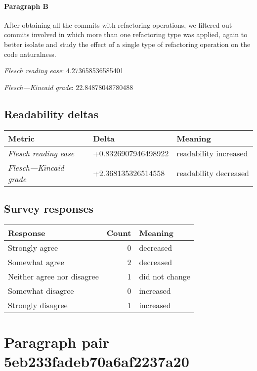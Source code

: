 \paragraph{Paragraph B}
After obtaining all the commits with refactoring operations, we filtered out commits involved in which more than one refactoring type was applied, again to better isolate and study the effect of a single type of refactoring operation on the code naturalness.\par\medskip\emph{Flesch reading ease}: 4.273658536585401\par\emph{Flesch---Kincaid grade}: 22.84878048780488

\subsection{Readability deltas}

\begin{tabular}{lll}
\toprule
               \textbf{Metric} &       \textbf{Delta} &       \textbf{Meaning} \\
\midrule
    \emph{Flesch reading ease} &  +0.8326907946498922 &  readability increased \\
 \emph{Flesch---Kincaid grade} &   +2.368135326514558 &  readability decreased \\
\bottomrule
\end{tabular}

\subsection{Survey responses}
\begin{tabular}{lrl}
\toprule
          \textbf{Response} &  \textbf{Count} & \textbf{Meaning} \\
\midrule
             Strongly agree &               0 &        decreased \\
             Somewhat agree &               2 &        decreased \\
 Neither agree nor disagree &               1 &   did not change \\
          Somewhat disagree &               0 &        increased \\
          Strongly disagree &               1 &        increased \\
\bottomrule
\end{tabular}

\section{Paragraph pair 5eb233fadeb70a6af2237a20}
